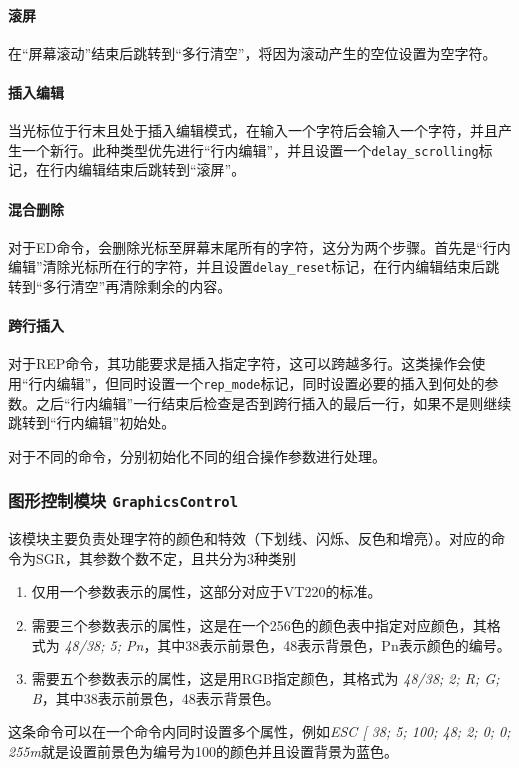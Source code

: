 \paragraph{滚屏}
在``屏幕滚动''结束后跳转到``多行清空''，将因为滚动产生的空位设置为空字符。

\paragraph{插入编辑}
当光标位于行末且处于插入编辑模式，在输入一个字符后会输入一个字符，并且产生一个新行。此种类型优先进行``行内编辑''，并且设置一个\texttt{delay\_scrolling}标记，在行内编辑结束后跳转到``滚屏''。

\paragraph{混合删除}
对于ED命令，会删除光标至屏幕末尾所有的字符，这分为两个步骤。首先是``行内编辑''清除光标所在行的字符，并且设置\texttt{delay\_reset}标记，在行内编辑结束后跳转到``多行清空''再清除剩余的内容。
\paragraph{跨行插入}
对于REP命令，其功能要求是插入指定字符，这可以跨越多行。这类操作会使用``行内编辑''，但同时设置一个\texttt{rep\_mode}标记，同时设置必要的插入到何处的参数。之后``行内编辑''一行结束后检查是否到跨行插入的最后一行，如果不是则继续跳转到``行内编辑''初始处。

对于不同的命令，分别初始化不同的组合操作参数进行处理。
\subsubsection{图形控制模块 \texttt{GraphicsControl}}
该模块主要负责处理字符的颜色和特效（下划线、闪烁、反色和增亮）。对应的命令为SGR，其参数个数不定，且共分为3种类别
\begin{enumerate}
	\item 仅用一个参数表示的属性，这部分对应于VT220的标准。
	\item 需要三个参数表示的属性，这是在一个256色的颜色表中指定对应颜色，其格式为 {\it 48/38; 5; Pn}，其中38表示前景色，48表示背景色，Pn表示颜色的编号。
	\item 需要五个参数表示的属性，这是用RGB指定颜色，其格式为 {\it 48/38; 2; R; G; B}，其中38表示前景色，48表示背景色。
\end{enumerate}

这条命令可以在一个命令内同时设置多个属性，例如{\it ESC [ 38; 5; 100; 48; 2; 0; 0; 255m}就是设置前景色为编号为100的颜色并且设置背景为蓝色。

